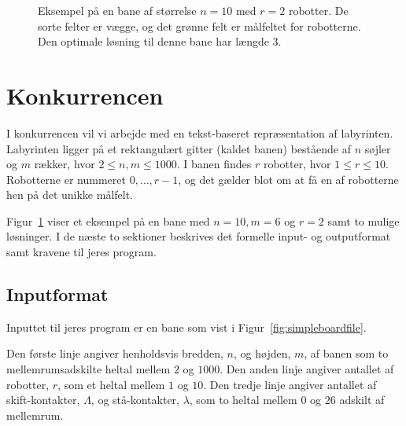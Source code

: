 \documentclass[10pt, a4paper]{article}
\begin{document}
\begin{figure}
\centering
{}
\hspace{0.2cm}
\hspace{0.2cm}
\caption{Eksempel på en bane af størrelse $n=10$ med $r=2$ robotter. De sorte felter er vægge, og det grønne felt er målfeltet for robotterne. Den optimale løsning til denne bane har længde 3.}
\label{fig:simpleboardexample}
\end{figure}

\section{Konkurrencen}
I konkurrencen vil vi arbejde med en tekst-baseret repræsentation af labyrinten.
Labyrinten ligger på et rektangulært gitter (kaldet banen) bestående af $n$ søjler og $m$ rækker, hvor $2 \leq n,m \leq 1000$.
I banen findes $r$ robotter, hvor $1 \leq r \leq 10$. Robotterne er nummeret $0, \ldots, r-1$, og det gælder blot om at få en af robotterne hen på det unikke målfelt.

Figur~\ref{fig:simpleboardexample} viser et eksempel på en bane med $n=10, m=6$ og $r=2$ samt to mulige løsninger. I de næste to sektioner beskrives det formelle input- og outputformat samt kravene til jeres program.

\subsection{Inputformat}
Inputtet til jeres program er en bane som vist i Figur~\ref{fig:simpleboardfile}.

Den første linje angiver henholdsvis bredden,  $n$, og højden, $m$,  af banen som to mellemrumsadskilte heltal mellem $2$ og $1000$.
Den anden linje angiver antallet af robotter, $r$, som et heltal mellem $1$ og $10$.
Den tredje linje angiver antallet af skift-kontakter, $\Lambda$, og stå-kontakter, $\lambda$, som to heltal mellem $0$ og $26$ adskilt af mellemrum.
\end{document}
